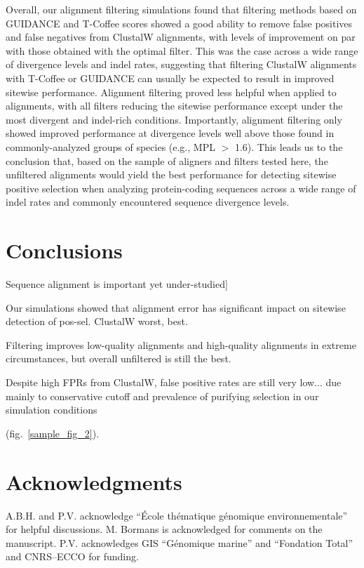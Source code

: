 \documentclass{mbe}
\begin{document}
Overall, our alignment filtering simulations found that filtering
methods based on GUIDANCE and T-Coffee scores showed a good ability to
remove false positives and false negatives from ClustalW alignments,
with levels of improvement on par with those obtained with the optimal
filter. This was the case across a wide range of divergence levels and
indel rates, suggesting that filtering ClustalW alignments with
T-Coffee or GUIDANCE can usually be expected to result in improved
sitewise performance. Alignment filtering proved less helpful when
applied to \prankc{} alignments, with all filters reducing the
sitewise performance except under the most divergent and indel-rich
conditions. Importantly, alignment filtering only showed improved
performance at divergence levels well above those found in
commonly-analyzed groups of species (e.g., MPL $>$ 1.6). This leads us
to the conclusion that, based on the sample of aligners and filters
tested here, the unfiltered \prankc{} alignments would yield the best
performance for detecting sitewise positive selection when analyzing
protein-coding sequences across a wide range of indel rates and
commonly encountered sequence divergence levels.

\section*{Conclusions}

Sequence alignment is important yet under-studied]

Our simulations showed that alignment error has significant impact on sitewise detection of pos-sel. ClustalW worst, \prankc{} best.

Filtering improves low-quality alignments and high-quality alignments in extreme circumstances, but overall unfiltered \prankc{} is still the best.

Despite high FPRs from ClustalW, false positive rates are still very low... due mainly to conservative cutoff and prevalence of purifying selection in our simulation conditions


(fig.~\ref{sample_fig_2}).



\section*{Acknowledgments}

A.B.H. and P.V. acknowledge ``\'Ecole th\'ematique
g\'enomique environnementale'' for helpful discussions. M. Bormans is
acknowledged for comments on the manuscript. P.V. acknowledges GIS
``G\'enomique marine'' and ``Fondation Total'' and CNRS--ECCO for funding.


\fontsize{9}{10}\selectfont%
\itemsep 0pt


\end{document}
